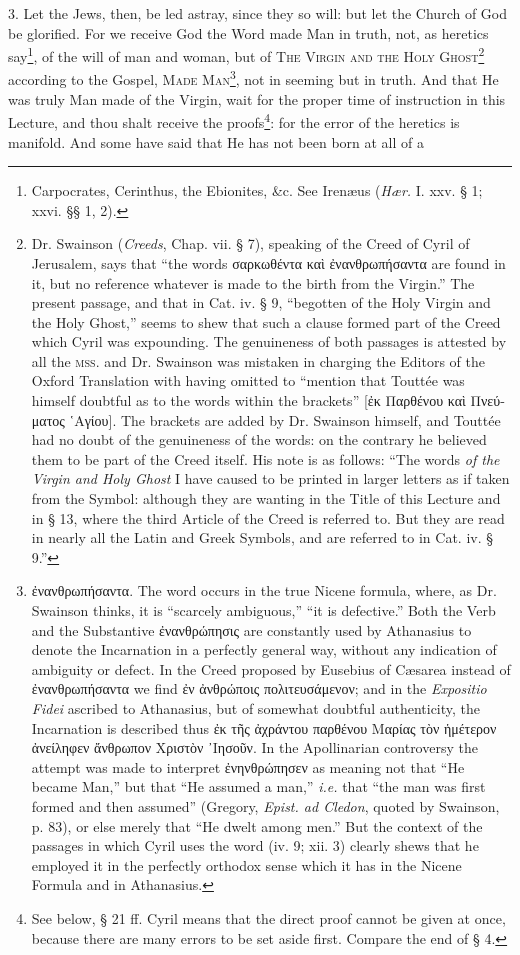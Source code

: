 3. Let the Jews, then, be led astray, since they so will: but let the Church of God be glorified. For we receive God the Word made Man in truth, not, as heretics say\footnote{Carpocrates, Cerinthus, the Ebionites, \&c. See Irenæus (\emph{Hær.} I. xxv. § 1; xxvi. §§ 1, 2).}, of the will of man and woman, but of \textsc{The Virgin and the Holy Ghost\footnote{Dr. Swainson (\emph{Creeds}, Chap. vii. § 7), speaking of the Creed of Cyril of Jerusalem, says that “the words \textgreek{σαρκωθέντα καὶ ἐνανθρωπήσαντα} are found in it, but no reference whatever is made to the birth from the Virgin.” The present passage, and that in Cat. iv. § 9, “begotten of the Holy Virgin and the Holy Ghost,” seems to shew that such a clause formed part of the Creed which Cyril was expounding. The genuineness of both passages is attested by all the \textsc{mss.} and Dr. Swainson was mistaken in charging the Editors of the Oxford Translation with having omitted to “mention that Touttée was himself doubtful as to the words within the brackets” [\textgreek{ἐκ Παρθένου καὶ Πνεύματος ῾Αγίου}]. The brackets are added by Dr. Swainson himself, and Touttée had no doubt of the genuineness of the words: on the contrary he believed them to be part of the Creed itself. His note is as follows: “The words \emph{of the Virgin and Holy Ghost} I have caused to be printed in larger letters as if taken from the Symbol: although they are wanting in the Title of this Lecture and in § 13, where the third Article of the Creed is referred to. But they are read in nearly all the Latin and Greek Symbols, and are referred to in Cat. iv. § 9.”}} according to the Gospel, \textsc{Made Man\footnote{\textgreek{ἐνανθρωπήσαντα}. The word occurs in the true Nicene formula, where, as Dr. Swainson thinks, it is “scarcely ambiguous,” “it is defective.” Both the Verb and the Substantive \textgreek{ἐνανθρώπησις} are constantly used by Athanasius to denote the Incarnation in a perfectly general way, without any indication of ambiguity or defect. In the Creed proposed by Eusebius of Cæsarea instead of \textgreek{ἐνανθρωπήσαντα} we find \textgreek{ἐν ἀνθρώποις πολιτευσάμενον}; and in the \emph{Expositio Fidei} ascribed to Athanasius, but of somewhat doubtful authenticity, the Incarnation is described thus \textgreek{ἐκ τῆς ἀχράντου παρθένου Μαρίας τὸν ἡμέτερον ἀνείληφεν ἄνθρωπον Χριστὸν ᾽Ιησοῦν}. In the Apollinarian controversy the attempt was made to interpret \textgreek{ἐνηνθρώπησεν} as meaning not that “He became Man,” but that “He assumed a man,” \emph{i.e.} that “the man was first formed and then assumed” (Gregory, \emph{Epist. ad Cledon}, quoted by Swainson, p. 83), or else merely that “He dwelt among men.” But the context of the passages in which Cyril uses the word (iv. 9; xii. 3) clearly shews that he employed it in the perfectly orthodox sense which it has in the Nicene Formula and in Athanasius.}}, not in seeming but in truth. And that He was truly Man made of the Virgin, wait for the proper time of instruction in this Lecture, and thou shalt receive the proofs\footnote{See below, § 21 ff. Cyril means that the direct proof cannot be given at once, because there are many errors to be set aside first. Compare the end of § 4.}: for the error of the heretics is manifold. And some have said that He has not been born at all of a 